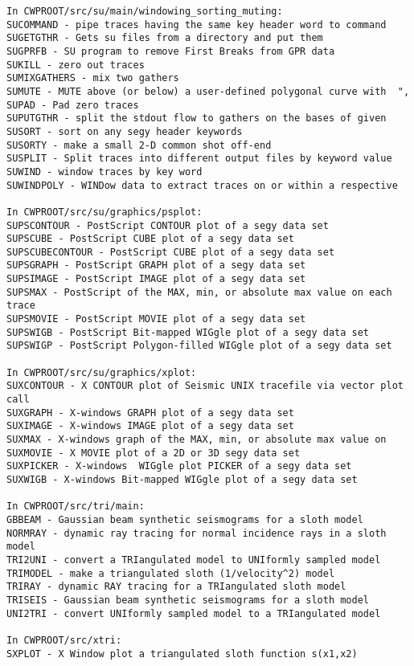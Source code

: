{\begin{verbatim}
In CWPROOT/src/su/main/windowing_sorting_muting:
SUCOMMAND - pipe traces having the same key header word to command	
SUGETGTHR - Gets su files from a directory and put them               
SUGPRFB - SU program to remove First Breaks from GPR data		
SUKILL - zero out traces					
SUMIXGATHERS - mix two gathers					
SUMUTE - MUTE above (or below) a user-defined polygonal curve with	", 
SUPAD - Pad zero traces						
SUPUTGTHR - split the stdout flow to gathers on the bases of given	
SUSORT - sort on any segy header keywords			
SUSORTY - make a small 2-D common shot off-end  		
SUSPLIT - Split traces into different output files by keyword value	
SUWIND - window traces by key word					
SUWINDPOLY - WINDow data to extract traces on or within a respective	

In CWPROOT/src/su/graphics/psplot:
SUPSCONTOUR - PostScript CONTOUR plot of a segy data set		
SUPSCUBE - PostScript CUBE plot of a segy data set			
SUPSCUBECONTOUR - PostScript CUBE plot of a segy data set		
SUPSGRAPH - PostScript GRAPH plot of a segy data set			
SUPSIMAGE - PostScript IMAGE plot of a segy data set			
SUPSMAX - PostScript of the MAX, min, or absolute max value on each trace
SUPSMOVIE - PostScript MOVIE plot of a segy data set			
SUPSWIGB - PostScript Bit-mapped WIGgle plot of a segy data set	
SUPSWIGP - PostScript Polygon-filled WIGgle plot of a segy data set	

In CWPROOT/src/su/graphics/xplot:
SUXCONTOUR - X CONTOUR plot of Seismic UNIX tracefile via vector plot call
SUXGRAPH - X-windows GRAPH plot of a segy data set			
SUXIMAGE - X-windows IMAGE plot of a segy data set	                
SUXMAX - X-windows graph of the MAX, min, or absolute max value on	
SUXMOVIE - X MOVIE plot of a 2D or 3D segy data set 			
SUXPICKER - X-windows  WIGgle plot PICKER of a segy data set		
SUXWIGB - X-windows Bit-mapped WIGgle plot of a segy data set		

In CWPROOT/src/tri/main:
GBBEAM - Gaussian beam synthetic seismograms for a sloth model 	
NORMRAY - dynamic ray tracing for normal incidence rays in a sloth model
TRI2UNI - convert a TRIangulated model to UNIformly sampled model	
TRIMODEL - make a triangulated sloth (1/velocity^2) model                  		
TRIRAY - dynamic RAY tracing for a TRIangulated sloth model		
TRISEIS - Gaussian beam synthetic seismograms for a sloth model	
UNI2TRI - convert UNIformly sampled model to a TRIangulated model	

In CWPROOT/src/xtri:
SXPLOT - X Window plot a triangulated sloth function s(x1,x2)		


\end{verbatim}}
